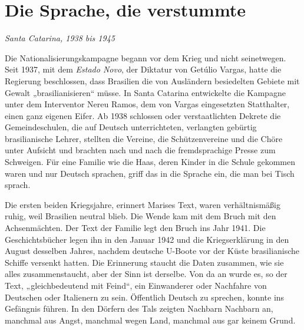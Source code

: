 \documentclass[
  ngerman,
  11pt,
  openany]{book}
\begin{document}
\section{Die Sprache, die verstummte}\label{die-sprache-die-verstummte}

\emph{Santa Catarina, 1938 bis 1945}

Die Nationalisierungskampagne begann vor dem Krieg und nicht
seinetwegen. Seit 1937, mit dem \emph{Estado Novo}, der Diktatur von
Getúlio Vargas, hatte die Regierung beschlossen, dass Brasilien die von
Ausländern besiedelten Gebiete mit Gewalt „brasilianisieren`` müsse. In
Santa Catarina entwickelte die Kampagne unter dem Interventor Nereu
Ramos, dem von Vargas eingesetzten Statthalter, einen ganz eigenen
Eifer. Ab 1938 schlossen oder verstaatlichten Dekrete die
Gemeindeschulen, die auf Deutsch unterrichteten, verlangten gebürtig
brasilianische Lehrer, stellten die Vereine, die Schützenvereine und die
Chöre unter Aufsicht und brachten nach und nach die fremdsprachige
Presse zum Schweigen. Für eine Familie wie die Haas, deren Kinder in die
Schule gekommen waren und nur Deutsch sprachen, griff das in die Sprache
ein, die man bei Tisch sprach.

Die ersten beiden Kriegsjahre, erinnert Marises Text, waren
verhältnismäßig ruhig, weil Brasilien neutral blieb. Die Wende kam mit
dem Bruch mit den Achsenmächten. Der Text der Familie legt den Bruch ins
Jahr 1941. Die Geschichtsbücher legen ihn in den Januar 1942 und die
Kriegserklärung in den August desselben Jahres, nachdem deutsche U-Boote
vor der Küste brasilianische Schiffe versenkt hatten. Die Erinnerung
staucht die Daten zusammen, wie sie alles zusammenstaucht, aber der Sinn
ist derselbe. Von da an wurde es, so der Text, „gleichbedeutend mit
Feind``, ein Einwanderer oder Nachfahre von Deutschen oder Italienern zu
sein. Öffentlich Deutsch zu sprechen, konnte ins Gefängnis führen. In
den Dörfern des Tals zeigten Nachbarn Nachbarn an, manchmal aus Angst,
manchmal wegen Land, manchmal aus gar keinem Grund.
\end{document}
